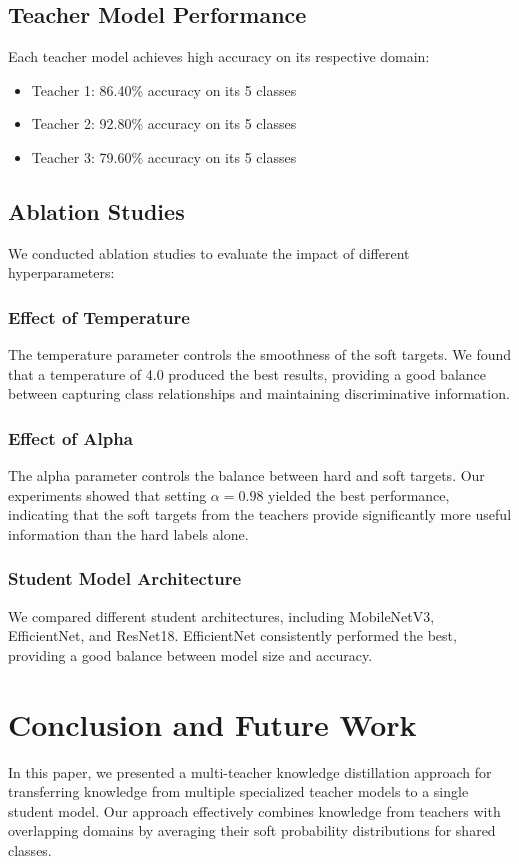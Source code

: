 \documentclass[conference]{IEEEtran}
\begin{document}
\subsection{Teacher Model Performance}
Each teacher model achieves high accuracy on its respective domain:
\begin{itemize}
    \item Teacher 1: 86.40\% accuracy on its 5 classes
    \item Teacher 2: 92.80\% accuracy on its 5 classes
    \item Teacher 3: 79.60\% accuracy on its 5 classes
\end{itemize}

\subsection{Ablation Studies}
We conducted ablation studies to evaluate the impact of different hyperparameters:

\subsubsection{Effect of Temperature}
The temperature parameter controls the smoothness of the soft targets. We found that a temperature of 4.0 produced the best results, providing a good balance between capturing class relationships and maintaining discriminative information.

\subsubsection{Effect of Alpha}
The alpha parameter controls the balance between hard and soft targets. Our experiments showed that setting $\alpha=0.98$ yielded the best performance, indicating that the soft targets from the teachers provide significantly more useful information than the hard labels alone.

\subsubsection{Student Model Architecture}
We compared different student architectures, including MobileNetV3, EfficientNet, and ResNet18. EfficientNet consistently performed the best, providing a good balance between model size and accuracy.

\section{Conclusion and Future Work}
In this paper, we presented a multi-teacher knowledge distillation approach for transferring knowledge from multiple specialized teacher models to a single student model. Our approach effectively combines knowledge from teachers with overlapping domains by averaging their soft probability distributions for shared classes.
\end{document}
